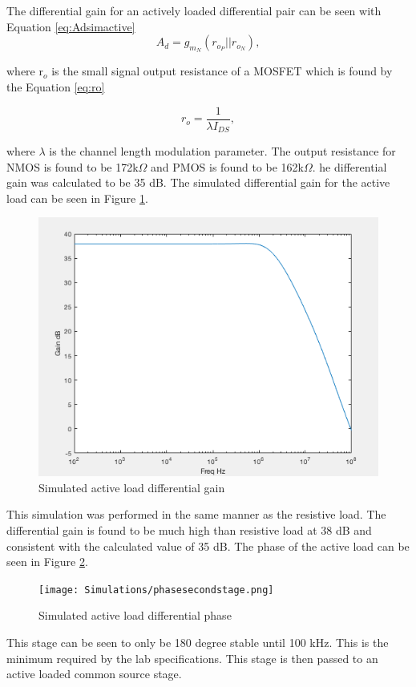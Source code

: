 The differential gain for an actively loaded differential pair can be seen with Equation \ref{eq:Adsimactive}
\begin{equation}
A_d = g_{m_N}(r_{o_P}||r_{o_N}),
\label{eqn:Ad_Active_Load}
\end{equation}

where  r$_o$ is the small signal output resistance of a MOSFET which is found by the Equation \ref{eq:ro}

\begin{equation}
r_o = \frac{1}{\lambda I_{DS}},
\label{eqn:ro}
\end{equation}

where  $\lambda$ is the channel length modulation parameter. The output resistance for NMOS is found to be 172k$\Omega$ and PMOS is found to be 162k$\Omega$. he differential gain was calculated to be 35 dB. The simulated differential gain for the active load can be seen in Figure \ref{fig:activeAdsim}.


\begin{figure}[H]
    \begin{center}
    \includegraphics[scale=.30]{Simulations/gainsecondstage.png}
    \caption{Simulated active load differential gain}
    \label{fig:activeAdsim}
    \end{center}
\end{figure}

This simulation was performed in the same manner as the resistive load. The differential gain is found to be much high than resistive load at 38 dB and consistent with the calculated value of 35 dB. The phase of the active load can be seen in Figure \ref{fig:activephase}.
\begin{figure}[H]
	\begin{center}
		\texttt{[image: Simulations/phasesecondstage.png]}
		\caption{Simulated active load differential phase}
		\label{fig:activephase}
	\end{center}
\end{figure}
This stage can be seen to only be 180 degree stable until 100 kHz. This is the minimum required by the lab specifications. This stage is then passed to an active loaded common source stage.

